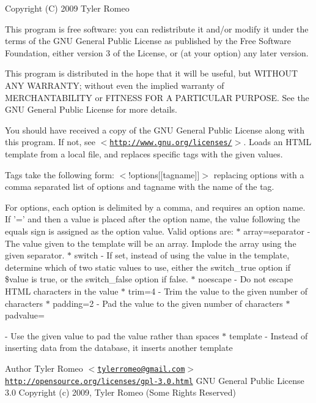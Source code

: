 Copyright (C) 2009 Tyler Romeo

This program is free software: you can redistribute it and/or modify it under the terms of the GNU General Public License as published by the Free Software Foundation, either version 3 of the License, or (at your option) any later version.

This program is distributed in the hope that it will be useful, but WITHOUT ANY WARRANTY; without even the implied warranty of MERCHANTABILITY or FITNESS FOR A PARTICULAR PURPOSE. See the GNU General Public License for more details.

You should have received a copy of the GNU General Public License along with this program. If not, see $<$\href{http://www.gnu.org/licenses/}{\tt http://www.gnu.org/licenses/}$>$. Loads an HTML template from a local file, and replaces specific tags with the given values.

Tags take the following form: $<$!options\mbox{[}\mbox{[}tagname\mbox{]}\mbox{]}$>$ replacing options with a comma separated list of options and tagname with the name of the tag.

For options, each option is delimited by a comma, and requires an option name. If '=' and then a value is placed after the option name, the value following the equals sign is assigned as the option value. Valid options are: $\ast$ array=separator -\/ The value given to the template will be an array. Implode the array using the given separator. $\ast$ switch -\/ If set, instead of using the value in the template, determine which of two static values to use, either the switch\_\-true option if \$value is true, or the switch\_\-false option if false. $\ast$ noescape -\/ Do not escape HTML characters in the value $\ast$ trim=4 -\/ Trim the value to the given number of characters $\ast$ padding=2 -\/ Pad the value to the given number of characters $\ast$ padvalue=\par
 -\/ Use the given value to pad the value rather than spaces $\ast$ template -\/ Instead of inserting data from the database, it inserts another template

\begin{DoxyAuthor}{Author}
Tyler Romeo $<$\href{mailto:tylerromeo@gmail.com}{\tt tylerromeo@gmail.com}$>$  \href{http://opensource.org/licenses/gpl-3.0.html}{\tt http://opensource.org/licenses/gpl-\/3.0.html} GNU General Public License 3.0  Copyright (c) 2009, Tyler Romeo (Some Rights Reserved) 
\end{DoxyAuthor}
